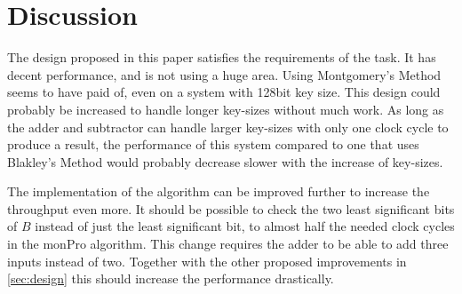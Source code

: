 \section{Discussion}
The design proposed in this paper satisfies the requirements of the task. It has decent performance, and is not using a huge area. Using Montgomery's Method seems to have paid of, even on a system with 128bit key size. This design could probably be increased to handle longer key-sizes without much work. As long as the adder and subtractor can handle larger key-sizes with only one clock cycle to produce a result, the performance of this system compared to one that uses Blakley's Method would probably decrease slower with the increase of key-sizes.

The implementation of the algorithm can be improved further to increase the throughput even more. It should be possible to check the two least significant bits of $B$ instead of just the least significant bit, to almost half the needed clock cycles in the monPro algorithm. This change requires the adder to be able to add three inputs instead of two. Together with the other proposed improvements in \cref{sec:design} this should increase the performance drastically.
